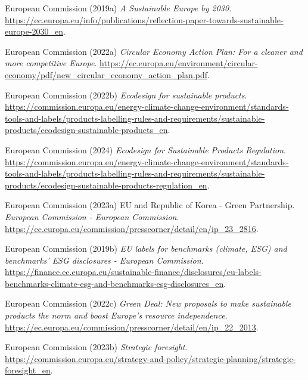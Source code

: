 \documentclass[
  letterpaper,
  DIV=11,
  numbers=noendperiod]{scrartcl}
\newlength{\cslhangindent}
\newenvironment{CSLReferences}[2] %
 {\begin{list}{}{%
  \setlength{\itemindent}{0pt}
  \setlength{\leftmargin}{0pt}
  \setlength{\parsep}{0pt}
  \ifodd #1
   \setlength{\leftmargin}{\cslhangindent}
   \setlength{\itemindent}{-1\cslhangindent}
  \fi
  \setlength{\itemsep}{#2\baselineskip}}}
 {\end{list}}
\begin{document}
\begin{CSLReferences}{0}{1}
European Commission (2019a) \emph{A {Sustainable Europe} by 2030}.
\url{https://ec.europa.eu/info/publications/reflection-paper-towards-sustainable-europe-2030_en}.

European Commission (2022a) \emph{Circular {Economy Action Plan}: {For}
a cleaner and more competitive {Europe}}.
\url{https://ec.europa.eu/environment/circular-economy/pdf/new_circular_economy_action_plan.pdf}.

European Commission (2022b) \emph{Ecodesign for sustainable products}.
\url{https://commission.europa.eu/energy-climate-change-environment/standards-tools-and-labels/products-labelling-rules-and-requirements/sustainable-products/ecodesign-sustainable-products_en}.

European Commission (2024) \emph{Ecodesign for {Sustainable Products
Regulation}}.
\url{https://commission.europa.eu/energy-climate-change-environment/standards-tools-and-labels/products-labelling-rules-and-requirements/sustainable-products/ecodesign-sustainable-products-regulation_en}.

European Commission (2023a) {EU} and {Republic} of {Korea} - {Green
Partnership}. \emph{European Commission - European Commission}.
\url{https://ec.europa.eu/commission/presscorner/detail/en/ip_23_2816}.

European Commission (2019b) \emph{{EU} labels for benchmarks (climate,
{ESG}) and benchmarks' {ESG} disclosures - {European Commission}}.
\url{https://finance.ec.europa.eu/sustainable-finance/disclosures/eu-labels-benchmarks-climate-esg-and-benchmarks-esg-disclosures_en}.

European Commission (2022c) \emph{Green {Deal}: {New} proposals to make
sustainable products the norm and boost {Europe}'s resource
independence}.
\url{https://ec.europa.eu/commission/presscorner/detail/en/ip_22_2013}.

European Commission (2023b) \emph{Strategic foresight}.
\url{https://commission.europa.eu/strategy-and-policy/strategic-planning/strategic-foresight_en}.


\end{CSLReferences}
\end{document}
